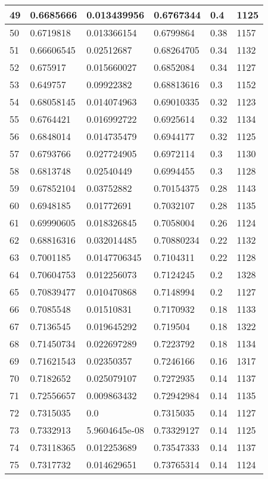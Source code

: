 \begin{longtable}{|l|l|l|l|l|l|}
49 & 0.6685666 & 0.013439956 & 0.6767344 & 0.4 & 1125 \\ \hline 
50 & 0.6719818 & 0.013366154 & 0.6799864 & 0.38 & 1157 \\ \hline 
51 & 0.66606545 & 0.02512687 & 0.68264705 & 0.34 & 1132 \\ \hline 
52 & 0.675917 & 0.015660027 & 0.6852084 & 0.34 & 1127 \\ \hline 
53 & 0.649757 & 0.09922382 & 0.68813616 & 0.3 & 1152 \\ \hline 
54 & 0.68058145 & 0.014074963 & 0.69010335 & 0.32 & 1123 \\ \hline 
55 & 0.6764421 & 0.016992722 & 0.6925614 & 0.32 & 1134 \\ \hline 
56 & 0.6848014 & 0.014735479 & 0.6944177 & 0.32 & 1125 \\ \hline 
57 & 0.6793766 & 0.027724905 & 0.6972114 & 0.3 & 1130 \\ \hline 
58 & 0.6813748 & 0.02540449 & 0.6994455 & 0.3 & 1128 \\ \hline 
59 & 0.67852104 & 0.03752882 & 0.70154375 & 0.28 & 1143 \\ \hline 
60 & 0.6948185 & 0.01772691 & 0.7032107 & 0.28 & 1135 \\ \hline 
61 & 0.69990605 & 0.018326845 & 0.7058004 & 0.26 & 1124 \\ \hline 
62 & 0.68816316 & 0.032014485 & 0.70880234 & 0.22 & 1132 \\ \hline 
63 & 0.7001185 & 0.0147706345 & 0.7104311 & 0.22 & 1128 \\ \hline 
64 & 0.70604753 & 0.012256073 & 0.7124245 & 0.2 & 1328 \\ \hline 
65 & 0.70839477 & 0.010470868 & 0.7148994 & 0.2 & 1127 \\ \hline 
66 & 0.7085548 & 0.01510831 & 0.7170932 & 0.18 & 1133 \\ \hline 
67 & 0.7136545 & 0.019645292 & 0.719504 & 0.18 & 1322 \\ \hline 
68 & 0.71450734 & 0.022697289 & 0.7223792 & 0.18 & 1134 \\ \hline 
69 & 0.71621543 & 0.02350357 & 0.7246166 & 0.16 & 1317 \\ \hline 
70 & 0.7182652 & 0.025079107 & 0.7272935 & 0.14 & 1137 \\ \hline 
71 & 0.72556657 & 0.009863432 & 0.72942984 & 0.14 & 1135 \\ \hline 
72 & 0.7315035 & 0.0 & 0.7315035 & 0.14 & 1127 \\ \hline 
73 & 0.7332913 & 5.9604645e-08 & 0.73329127 & 0.14 & 1125 \\ \hline 
74 & 0.73118365 & 0.012253689 & 0.73547333 & 0.14 & 1137 \\ \hline 
75 & 0.7317732 & 0.014629651 & 0.73765314 & 0.14 & 1124 \\ \hline 
\end{longtable}